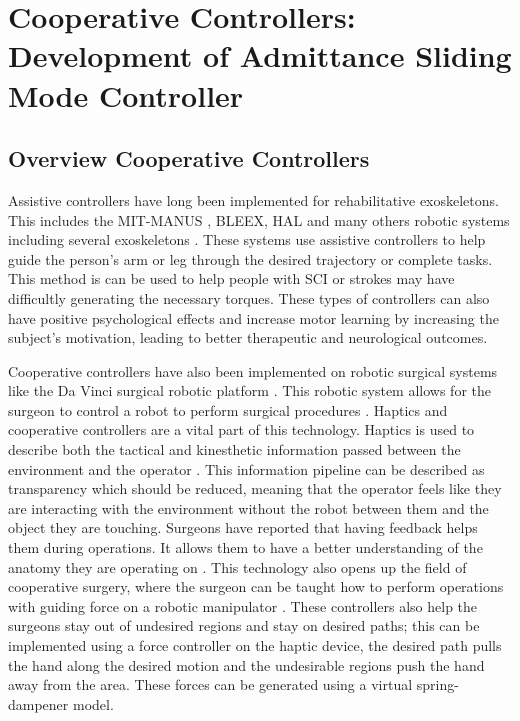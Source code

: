 \section{Cooperative Controllers: Development of Admittance Sliding Mode Controller}


\subsection{Overview Cooperative Controllers}
Assistive controllers have long been implemented for rehabilitative exoskeletons. This includes the MIT-MANUS \cite{ju2005rehabilitation}, BLEEX\cite{kazerooni2006hybrid}, HAL\cite{kawamoto2004power} and many others robotic systems including several exoskeletons \cite{kim2012admittance,ott2010unified,huo2011control}. These systems use assistive controllers to help guide the person's arm or leg through the desired trajectory or complete tasks. This method is can be used to help people with SCI or strokes may have difficultly generating the necessary torques. These types of controllers can also have positive psychological effects and increase motor learning by increasing the subject's motivation, leading to better therapeutic and neurological outcomes.

Cooperative controllers have also been implemented on robotic surgical systems like the Da Vinci surgical robotic platform \cite{d2021accelerating}. This robotic system allows for the surgeon to control a robot to perform surgical procedures \cite{el2020review,amirabdollahian2018prevalence,okamura2009haptic}. Haptics and cooperative controllers are a vital part of this technology. Haptics is used to describe both the tactical and kinesthetic information passed between the environment and the operator \cite{okamura2004methods}. This information pipeline can be described as transparency which should be reduced, meaning that the operator feels like they are interacting with the environment without the robot between them and the object they are touching. Surgeons have reported that having feedback helps them during operations. It allows them to have a better understanding of the anatomy they are operating on \cite{koehn2015surgeons}. 
This technology also opens up the field of cooperative surgery, where the surgeon can be taught how to perform operations with guiding force on a robotic manipulator \cite{varier2020collaborative}. These controllers also help the surgeons stay out of undesired regions and stay on desired paths; this can be implemented using a force controller on the haptic device, the desired path pulls the hand along the desired motion and the undesirable regions push the hand away from the area. These forces can be generated using a virtual spring-dampener model.



